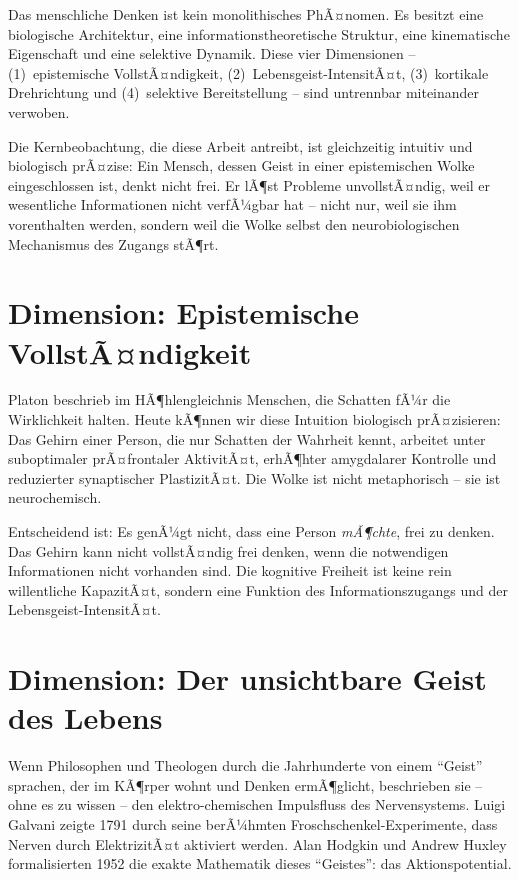 ﻿\documentclass[12pt,a4paper]{report}
\theoremstyle{plain}
\theoremstyle{definition}
\theoremstyle{remark}
\begin{document}
	Das menschliche Denken ist kein monolithisches PhÃ¤nomen. Es besitzt
	eine biologische Architektur, eine informationstheoretische Struktur,
	eine kinematische Eigenschaft und eine selektive Dynamik. Diese vier
	Dimensionen -- (1)~epistemische VollstÃ¤ndigkeit, (2)~Lebens\-geist-IntensitÃ¤t,
	(3)~kortikale Drehrichtung und (4)~selektive Bereitstellung -- sind
	untrennbar miteinander verwoben.
	
	Die Kernbeobachtung, die diese Arbeit antreibt, ist gleichzeitig intuitiv
	und biologisch prÃ¤zise: Ein Mensch, dessen Geist in einer epistemischen
	Wolke eingeschlossen ist, denkt nicht frei. Er lÃ¶st Probleme unvollstÃ¤ndig,
	weil er wesentliche Informationen nicht verfÃ¼gbar hat -- nicht nur,
	weil sie ihm vorenthalten werden, sondern weil die Wolke selbst den
	neurobiologischen Mechanismus des Zugangs stÃ¶rt.
	
	\section{Dimension: Epistemische VollstÃ¤ndigkeit}
	
	Platon beschrieb im HÃ¶hlengleichnis Menschen, die Schatten fÃ¼r die
	Wirklichkeit halten. Heute kÃ¶nnen wir diese Intuition biologisch prÃ¤zisieren:
	Das Gehirn einer Person, die nur Schatten der Wahrheit kennt, arbeitet
	unter suboptimaler prÃ¤frontaler AktivitÃ¤t, erhÃ¶hter amygdalarer
	Kontrolle und reduzierter synaptischer PlastizitÃ¤t. Die Wolke ist
	nicht metaphorisch -- sie ist neurochemisch.
	
	Entscheidend ist: Es genÃ¼gt nicht, dass eine Person
	\emph{mÃ¶chte}, frei zu denken. Das Gehirn kann nicht vollstÃ¤ndig
	frei denken, wenn die notwendigen Informationen nicht vorhanden sind.
	Die kognitive Freiheit ist keine rein willentliche KapazitÃ¤t, sondern
	eine Funktion des Informationszugangs und der Lebensgeist-IntensitÃ¤t.
	
	\section{Dimension: Der unsichtbare Geist des Lebens}
	
	Wenn Philosophen und Theologen durch die Jahrhunderte von einem ``Geist''
	sprachen, der im KÃ¶rper wohnt und Denken ermÃ¶glicht, beschrieben
	sie -- ohne es zu wissen -- den elektro-chemischen Impulsfluss des
	Nervensystems. Luigi Galvani zeigte 1791 durch seine berÃ¼hmten
	Froschschenkel-Experimente, dass Nerven durch ElektrizitÃ¤t aktiviert
	werden. Alan Hodgkin und Andrew Huxley formalisierten 1952 die exakte
	Mathematik dieses ``Geistes'': das Aktionspotential.
	
\end{document}
